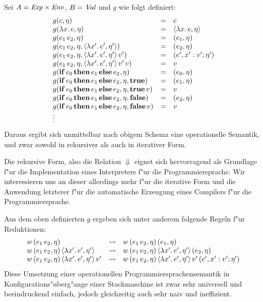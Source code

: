 \documentclass[12pt,a4paper,draft]{article}
\begin{document}
Sei $A = \mathit{Exp} \times \mathit{Env}$, $B = \mathit{Val}$ und $g$ wie folgt definiert:
\[\begin{array}{lcl}
  g(c,\eta) &=& c \\
  g(\lambda{x}.\,{e},\eta) &=& \langle{\lambda{x}.\,{e}},{\eta}\rangle \\
  g({e_1}\,{e_2},\eta) &=& (e_1,\eta) \\
  g({e_1}\,{e_2},\eta,\langle{\lambda{x'}.\,{e'}},{\eta'}\rangle) &=& (e_2,\eta) \\
  g({e_1}\,{e_2},\eta,\langle{\lambda{x'}.\,{e'}},{\eta'}\rangle\,v') &=& (e',x':v';\eta') \\
  g({e_1}\,{e_2},\eta,\langle{\lambda{x'}.\,{e'}},{\eta'}\rangle\,v'\,v) &=& v \\
  g(\mathbf{if}\,{e_0}\,\mathbf{then}\,{e_1}\,\mathbf{else}\,{e_2},\eta) &=& (e_0,\eta) \\
  g(\mathbf{if}\,{e_0}\,\mathbf{then}\,{e_1}\,\mathbf{else}\,{e_2},\eta,\mathbf{true}) &=& (e_1,\eta) \\
  g(\mathbf{if}\,{e_0}\,\mathbf{then}\,{e_1}\,\mathbf{else}\,{e_2},\eta,\mathbf{true}\,v) &=& v \\
  g(\mathbf{if}\,{e_0}\,\mathbf{then}\,{e_1}\,\mathbf{else}\,{e_2},\eta,\mathbf{false}) &=& (e_2,\eta) \\
  g(\mathbf{if}\,{e_0}\,\mathbf{then}\,{e_1}\,\mathbf{else}\,{e_2},\eta,\mathbf{false}\,v) &=& v \\
  \vdots \\
\end{array}\]
Daraus ergibt sich unmittelbar nach obigem Schema eine operationelle Semantik, und zwar
sowohl in rekursiver als auch in iterativer Form.

Die rekursive Form, also die Relation $\Downarrow$ eignet sich hervorragend als Grundlage
f"ur die Implementation eines Interpreters f"ur die Programmiersprache. Wir interessieren
uns an dieser allerdings mehr f"ur die iterative Form und die Anwendung letzterer f"ur
die automatische Erzeugung eines Compilers f"ur die Programmiersprache.

Aus dem oben definierten $g$ ergeben sich unter anderem folgende Regeln f"ur Reduktionen:
\[\begin{array}{lcl}
  w\,({e_1}\,{e_2},\eta)
  &\rightsquigarrow& w\,({e_1}\,{e_2},\eta)\,(e_1,\eta) \\
  w\,({e_1}\,{e_2},\eta)\,\langle{\lambda{x'}.\,{e'}},{\eta'}\rangle
  &\rightsquigarrow& w\,({e_1}\,{e_2},\eta)\,\langle{\lambda{x'}.\,{e'}},{\eta'}\rangle\,(e_2,\eta) \\
  w\,({e_1}\,{e_2},\eta)\,\langle{\lambda{x'}.\,{e'}},{\eta'}\rangle\,v'
  &\rightsquigarrow& w\,({e_1}\,{e_2},\eta)\,\langle{\lambda{x'}.\,{e'}},{\eta'}\rangle\,v'\,(e',x':v';\eta') \\
\end{array}\]
Diese Umsetzung einer operationellen Programmiersprachensemantik in Konfigurations"uberg"ange einer Stackmaschine
ist zwar sehr universell und beeindruckend einfach, jedoch gleichzeitig auch sehr naiv und ineffizient.
\end{document}
